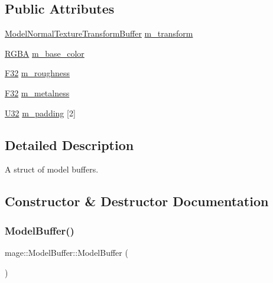 \subsection*{Public Attributes}
\begin{DoxyCompactItemize}
\item 
\hyperlink{structmage_1_1_model_normal_texture_transform_buffer}{Model\+Normal\+Texture\+Transform\+Buffer} \hyperlink{structmage_1_1_model_buffer_adb77c7da1573f0d94665b73ea1887420}{m\+\_\+transform}
\item 
\hyperlink{structmage_1_1_r_g_b_a}{R\+G\+BA} \hyperlink{structmage_1_1_model_buffer_aaad37de854c5ba951107d2c18880fbbd}{m\+\_\+base\+\_\+color}
\item 
\hyperlink{namespacemage_aa97e833b45f06d60a0a9c4fc22ae02c0}{F32} \hyperlink{structmage_1_1_model_buffer_a33adb9ff193fcccf618bf6ceb7b1a31e}{m\+\_\+roughness}
\item 
\hyperlink{namespacemage_aa97e833b45f06d60a0a9c4fc22ae02c0}{F32} \hyperlink{structmage_1_1_model_buffer_a1be491fffd79c3e5d37d066f0ef9ab96}{m\+\_\+metalness}
\item 
\hyperlink{namespacemage_a41c104c036fba3756a74e19f793eeaa1}{U32} \hyperlink{structmage_1_1_model_buffer_a11ae104f8ba32afbd910a2f18d04d352}{m\+\_\+padding} \mbox{[}2\mbox{]}
\end{DoxyCompactItemize}


\subsection{Detailed Description}
A struct of model buffers. 

\subsection{Constructor \& Destructor Documentation}
\hypertarget{structmage_1_1_model_buffer_a9069cfb6d75067b7f1509332fbec9be0}{}\label{structmage_1_1_model_buffer_a9069cfb6d75067b7f1509332fbec9be0} 
\subsubsection{\texorpdfstring{Model\+Buffer()}{ModelBuffer()}\hspace{0.1cm}{\footnotesize\ttfamily [1/3]}}
{\footnotesize\ttfamily mage\+::\+Model\+Buffer\+::\+Model\+Buffer (\begin{DoxyParamCaption}{ }\end{DoxyParamCaption})}


